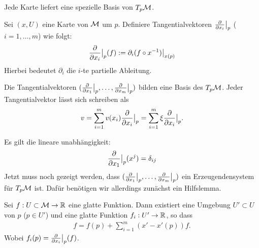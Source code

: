 Jede Karte liefert eine spezielle Basis von $T_{p} \mathcal{M}$.

\begin{defs}
Sei $(x, U)$ eine Karte von $\mathcal{M}$ um $p$. 
Definiere Tangentialvektoren $\pdv{x_i}\big\vert_{p} $ ($i = 1, \dots, m$) wie folgt:
\begin{align}
\pdv{x_i}\big\vert_{p} (f) := \partial_i (f \circ x^{-1}) \big\vert_{x(p)}
\end{align}
Hierbei bedeutet $\partial_i$ die $i$-te partielle Ableitung.
\end{defs}

\begin{satz}
\label{satz:BasisTPM}
Die Tangentialvektoren $(\pdv{x_1}\big\vert_{p}, \dots, \pdv{x_m}\big\vert_{p})$ bilden eine Basis des $T_{p} \mathcal{M}$.
Jeder Tangentialvektor lässt sich schreiben als
\begin{align}
v = \sum_{i=1}^{m} v(x_i) \pdv{x_i}\big\vert_{p} = \sum_{i=1}^{m} \xi \pdv{x_i}\big\vert_{p}.
\end{align}
\end{satz}
\begin{bew}
Es gilt die lineare unabhängigkeit:
\begin{align}
\pdv{x_1}\big\vert_{p} (x^j) = \delta_{i j}
\end{align}
Jetzt muss noch gezeigt werden, dass $(\pdv{x_1}\big\vert_{p}, \dots, \pdv{x_m}\big\vert_{p})$ ein Erzeugendensystem für $T_{p} \mathcal{M}$ ist.
 Dafür benötigen wir allerdings zunächst ein Hilfslemma.
\end{bew}

\begin{lem}
\label{lem:DarstellungBasisTPM}
Sei $f: U \subset \mathcal{M} \to \mathbb{R}$ eine glatte Funktion.
Dann existiert eine Umgebung $U' \subset U$ von $p$ ($p \in U'$) und eine glatte Funktion
$f_i: U' \to \mathbb{R}$, so dass
\begin{align}
f = f(p) + \sum_{i=1}^{m} ( x' - x'(p)) f.
\end{align}
Wobei $f_i (p) = \pdv{x_i}\big\vert_{p} (f)$.
\end{lem}

